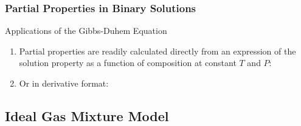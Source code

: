 \documentclass[10pt,compress,unknownkeysallowed]{beamer}
\begin{document}
\begin{frame}
  \frametitle{Partial Properties in Binary Solutions}
    \begin{block}{\begin{center}\normalsize{Applications of the Gibbs-Duhem Equation }\end{center}}
      \begin{enumerate}%
         \item<1->Partial properties are readily calculated directly from an expression of the solution property as a function of composition at constant $T$ and $P$:
         \item<2->Or in derivative format:
      \end{enumerate}
   \end{block}
\end{frame}
\normalsize



\subsection{Ideal Gas Mixture Model}
\end{document}
